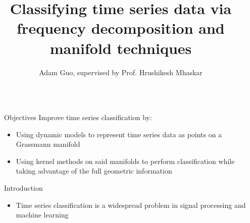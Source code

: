 \documentclass[final]{beamer}
\title{Classifying time series data via frequency decomposition and manifold techniques} %
\author{Adam Guo, supervised by Prof. Hrushikesh Mhaskar} %
\institute{Pomona College ('22), Claremont Graduate University} %
\newlength{\sepwid}
\newlength{\onecolwid}
\begin{document}

\setlength{\belowcaptionskip}{2ex} %
\setlength\belowdisplayshortskip{2ex} %

\begin{frame}[t] %

\begin{columns}[t] %

\begin{column}{\sepwid}\end{column} %

\begin{column}{\onecolwid} %


\begin{alertblock}{Objectives}
    Improve time series classification by:
    \begin{itemize}
        \item Using dynamic models to represent time series data as points on a Grassmann manifold
        \item Using kernel methods on said manifolds to perform classification while taking
            advantage of the full geometric information
    \end{itemize}
\end{alertblock}


\begin{block}{Introduction}
    \begin{itemize}
        \item Time series classification is a widespread problem in signal processing and machine
            learning


\end{itemize}
\end{block}
\end{column}
\end{columns}
\end{frame}
\end{document}
